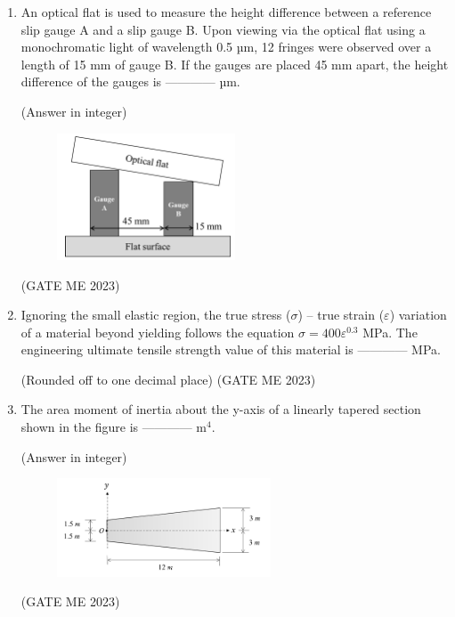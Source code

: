 \documentclass[journal]{IEEEtran}
\begin{document}
\begin{enumerate}
\item An optical flat is used to measure the height difference between a reference slip gauge A and a slip gauge B. Upon viewing via the optical flat using a monochromatic light of wavelength 0.5 µm, 12 fringes were observed over a length of 15 mm of gauge B. If the gauges are placed 45 mm apart, the height difference of the gauges is ------------ µm.

(Answer in integer)

\begin{figure}[H]
\centering
\includegraphics[width=0.5\textwidth]{Fig 50.png}
\caption{}
\label{fig:question56}
\end{figure}
\hfill (GATE ME 2023)

\item Ignoring the small elastic region, the true stress ($\sigma$) – true strain ($\varepsilon$) variation of a material beyond yielding follows the equation $\sigma = 400\varepsilon^{0.3}$ MPa. The engineering ultimate tensile strength value of this material is ------------ MPa.

(Rounded off to one decimal place)
\hfill (GATE ME 2023)

\item The area moment of inertia about the y-axis of a linearly tapered section shown in the figure is ------------ m$^4$. 

(Answer in integer)

\begin{figure}[H]
\centering
\includegraphics[width=0.6\textwidth]{Fig 51.png}
\caption{}
\label{fig:question58}
\end{figure}
\hfill (GATE ME 2023)


\end{enumerate}
\end{document}
